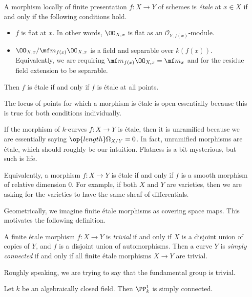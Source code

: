 \documentclass[../notes.tex]{subfiles}
\begin{document}
\begin{defihelper}[\'etale] 
	A morphism locally of finite presentation $f\colon X\to Y$ of schemes is \textit{\'etale} at $x\in X$ if and only if the following conditions hold.
	\begin{itemize}
		\item $f$ is flat at $x$. In other words, $\OO_{X,x}$ is flat as an $\mathcal O_{Y,f(x)}$-module.
		\item $\OO_{X,x}/\mf m_{f(x)}\OO_{X,x}$ is a field and separable over $k(f(x))$. Equivalently, we are requiring $\mf m_{f(x)}\OO_{X,x}=\mf m_x$ and for the residue field extension to be separable.
	\end{itemize}
	Then $f$ is \'etale if and only if $f$ is \'etale at all points.
\end{defihelper}
\begin{remark}
	The locus of points for which a morphism is \'etale is open essentially because this is true for both conditions individually.
\end{remark}
\begin{remark}
	If the morphism of $k$-curves $f\colon X\to Y$ is \'etale, then it is unramified because we are essentially saying $\op{length}\Omega_{X/Y}=0$. In fact, unramified morphisms are \'etale, which should roughly be our intuition. Flatness is a bit mysterious, but such is life.
\end{remark}
\begin{remark}
	Equivalently, a morphism $f\colon X\to Y$ is \'etale if and only if $f$ is a smooth morphism of relative dimension $0$. For example, if both $X$ and $Y$ are varieties, then we are asking for the varieties to have the same sheaf of differentials.
\end{remark}
Geometrically, we imagine finite \'etale morphisms as covering space maps. This motivates the following definition.
\begin{definition}
	A finite \'etale morphism $f\colon X\to Y$ is \textit{trivial} if and only if $X$ is a disjoint union of copies of $Y$, and $f$ is a disjoint union of automorphisms. Then a curve $Y$ is \textit{simply connected} if and only if all finite \'etale morphisms $X\to Y$ are trivial.
\end{definition}
Roughly speaking, we are trying to say that the fundamental group is trivial.
\begin{proposition}
	Let $k$ be an algebraically closed field. Then $\PP^1_k$ is simply connected.
\end{proposition}
\end{document}
